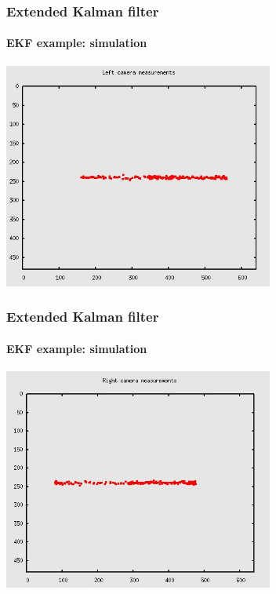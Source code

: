 \documentclass[aspectratio=169]{beamer}
\begin{document}
\begin{frame}
\frametitle{Extended Kalman filter}
\framesubtitle{EKF example: simulation}

\begin{center}
\includegraphics[width=3.5in]{left-cam}
\end{center}

\end{frame}
\begin{frame}
\frametitle{Extended Kalman filter}
\framesubtitle{EKF example: simulation}

\begin{center}
\includegraphics[width=3.5in]{right-cam}
\end{center}

\end{frame}
\end{document}
